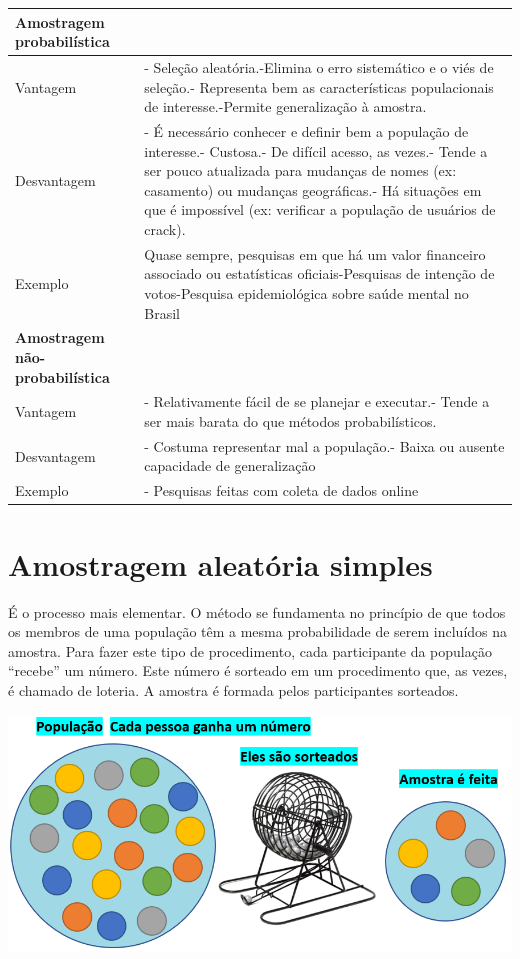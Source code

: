 \documentclass[
]{book}
\begin{document}
\begin{longtable}[]{@{}
  >{\raggedright\arraybackslash}p{}
  >{\raggedright\arraybackslash}p{}@{}}
\toprule
Amostragem probabilística & \\
\midrule
\endhead
Vantagem & - Seleção aleatória.-Elimina o erro sistemático e o viés de seleção.- Representa bem as características populacionais de interesse.-Permite generalização à amostra. \\
Desvantagem & - É necessário conhecer e definir bem a população de interesse.- Custosa.- De difícil acesso, as vezes.- Tende a ser pouco atualizada para mudanças de nomes (ex: casamento) ou mudanças geográficas.- Há situações em que é impossível (ex: verificar a população de usuários de crack). \\
Exemplo & Quase sempre, pesquisas em que há um valor financeiro associado ou estatísticas oficiais-Pesquisas de intenção de votos-Pesquisa epidemiológica sobre saúde mental no Brasil \\
\textbf{Amostragem não-probabilística} & \\
Vantagem & - Relativamente fácil de se planejar e executar.- Tende a ser mais barata do que métodos probabilísticos. \\
Desvantagem & - Costuma representar mal a população.- Baixa ou ausente capacidade de generalização \\
Exemplo & - Pesquisas feitas com coleta de dados online \\
\bottomrule
\end{longtable}

\hypertarget{amostragem-aleatuxf3ria-simples}{%
\section{Amostragem aleatória simples}\label{amostragem-aleatuxf3ria-simples}}

É o processo mais elementar. O método se fundamenta no princípio de que todos os membros de uma população têm a mesma probabilidade de serem incluídos na amostra. Para fazer este tipo de procedimento, cada participante da população ``recebe'' um número. Este número é sorteado em um procedimento que, as vezes, é chamado de loteria. A amostra é formada pelos participantes sorteados.

\includegraphics{./img/cap_aas.png}
\end{document}
